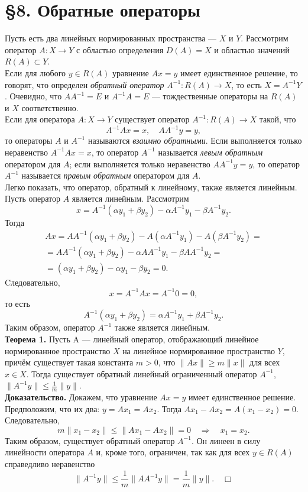 \documentclass[12pt,a4paper, titlepage]{article}
\begin{document}
\section*{ \S 8. Обратные операторы}

Пусть есть два линейных нормированных пространства --- $X$ и $Y$. Рассмотрим оператор $A: X \to Y$ с областью определения $D(A) = X$ и областью значений $R(A) \subset Y$.\\

Если для любого $y \in R(A)$ уравнение $Ax = y$ имеет единственное решение, то говорят, что определен \textit{обратный оператор} $A^{-1}: R(A) \to X$, то есть $X = A^{-1} Y$. Очевидно, что $A A^{-1} = E$ и $A^{-1} A = E$ --- тождественные операторы на $R(A)$ и $X$ соответственно.\\

Если для оператора $A: X \to Y$ существует оператор $A^{-1}: R(A) \to X$ такой, что
$$
A^{-1} A x = x, \quad A A^{-1} y = y,
$$
то операторы $A$ и $A^{-1}$ называются \textit{взаимно обратными}. Если выполняется только неравенство $A^{-1} A x = x$, то оператор $A^{-1}$ называется \textit{левым обратным} оператором для $A$; если выполняется только неравенство $A A^{-1} y = y$, то оператор $A^{-1}$ называется \textit{правым обратным} оператором для $A$.\\

Легко показать, что оператор, обратный к линейному, также является линейным. Пусть оператор $A$ является линейным. Рассмотрим
$$
x = A^{-1} (\alpha y_1 + \beta y_2) - \alpha A^{-1} y_1 - \beta A^{-1} y_2.
$$
Тогда
\begin{multline*}
Ax = A A^{-1} (\alpha y_1 + \beta y_2) - A (\alpha A^{-1} y_1 )- A(\beta A^{-1} y_2) = \\
= A A^{-1} (\alpha y_1 + \beta y_2) - \alpha A A^{-1} y_1 - \beta A A^{-1} y_2 = \\
= (\alpha y_1 + \beta y_2) - \alpha y_1 - \beta y_2 = 0. 
\end{multline*}
Cледовательно, 
$$
x = A^{-1} Ax = A^{-1} 0 = 0,
$$
то есть
$$
A^{-1} (\alpha y_1 + \beta y_2) = \alpha A^{-1} y_1 + \beta A^{-1} y_2.
$$
Таким образом, оператор $A^{-1}$ также является линейным.\\

\textbf{Теорема 1.} Пусть A --- линейный оператор, отображающий линейное нормированное пространство $X$ на линейное нормированное пространство $Y$, причём существует такая константа $m > 0$, что $\|Ax\| \geqslant m \|x\|$ для всех $x \in X$. Тогда существует обратный линейный ограниченный оператор $A^{-1}$, $\|A^{-1} y \| \leqslant \frac 1 m \|y\|$.\\
\textbf{Доказательство.} Докажем, что уравнение $Ax = y$ имеет единственное решение. Предположим, что их два: $y = Ax_1 = Ax_2$. Тогда $Ax_1 - Ax_2 = A(x_1 - x_2) = 0$. Следовательно,
$$
m \|x_1 - x_2\| \leqslant \|Ax_1 - Ax_2\| = 0 \quad \Rightarrow \quad x_1 = x_2.
$$
Таким образом, существует обратный оператор $A^{-1}$. Он линеен в силу линейности оператора $A$ и, кроме того, ограничен, так как для всех $y \in R(A)$ справедливо неравенство
$$
\|A^{-1} y \| \leqslant \frac 1 m \|A A^{-1} y\| = \frac 1 m \|y\|. \quad \Box
$$
\end{document}
